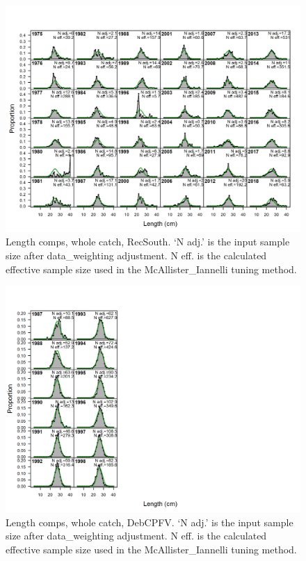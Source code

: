 \documentclass[12pt,]{article}
\begin{document}
\begin{figure}
\centering
\includegraphics{./r4ss/plots_mod1/comp_lenfit_flt3mkt0.png}
\caption{Length comps, whole catch, RecSouth. `N adj.' is the input
sample size after data\_weighting adjustment. N eff. is the calculated
effective sample size used in the McAllister\_Iannelli tuning method.
\label{fig:mod1_3_comp_lenfit_flt3mkt0}}
\end{figure}

\begin{figure}
\centering
\includegraphics{./r4ss/plots_mod1/comp_lenfit_flt4mkt0.png}
\caption{Length comps, whole catch, DebCPFV. `N adj.' is the input
sample size after data\_weighting adjustment. N eff. is the calculated
effective sample size used in the McAllister\_Iannelli tuning method.
\label{fig:mod1_4_comp_lenfit_flt4mkt0}}
\end{figure}
\end{document}
